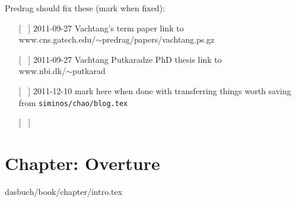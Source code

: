 Predrag should fix these (mark when fixed):
\begin{itemize}
  \item[[~]] 2011-09-27
{Vachtang's term paper} link to
\\
www.cns.gatech.edu/$\sim$predrag/papers/vachtang.ps.gz
  \item[[~]] 2011-09-27
{Vachtang Putkaradze PhD thesis} link to
\\
www.nbi.dk/$\sim$putkarad
  \item[[~]] 2011-12-10
mark here when done with transferring things worth saving from
\texttt{siminos/chao/blog.tex}
  \item[[~]]
\end{itemize}


\section{Chapter: Overture}
\label{c-intro}\noindent dasbuch/book/chapter/intro.tex

